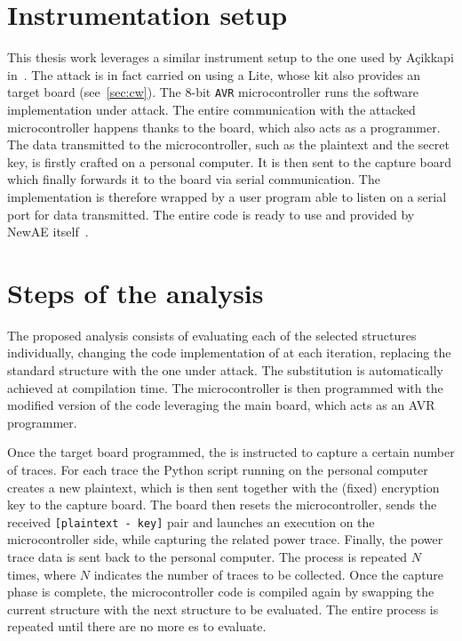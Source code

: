     \section{Instrumentation setup}

        This thesis work leverages a similar instrument setup to the one used by Açikkapi in~\cite{accikkapi2019side}. The attack is in fact carried on using a \cw{} Lite, whose kit also provides an \xmega{} target board (see~\ref{sec:cw}). The \xmega{} 8-bit \texttt{AVR} microcontroller runs the \aess{} software implementation under attack. The entire communication with the attacked microcontroller happens thanks to the \cw{} board, which also acts as a programmer. The data transmitted to the microcontroller, such as the plaintext and the secret key, is firstly crafted on a personal computer. It is then sent to the \cw{} capture board which finally forwards it to the \xmega{} board via serial communication. The \aess{} implementation is therefore wrapped by a user program able to listen on a serial port for data transmitted. The entire \xmega{} code is ready to use and provided by NewAE itself~\cite{cwgithub}.

    \section{Steps of the analysis}

        The proposed analysis consists of evaluating each of the selected structures individually, changing the code implementation of \aess{} at each iteration, replacing the standard \sbocs{} structure with the one under attack. The substitution is automatically achieved at compilation time. The microcontroller is then programmed with the modified version of the code leveraging the main \cw{} board, which acts as an AVR programmer. 
        
        Once the target board programmed, the \cw{} is instructed to capture a certain number of traces. For each trace the Python script running on the personal computer creates a new plaintext, which is then sent together with the (fixed) encryption key to the capture board. The board then resets the microcontroller, sends the received \texttt{[plaintext - key]} pair and launches an \aess{} execution on the microcontroller side, while capturing the related power trace. Finally, the power trace data is sent back to the personal computer. The process is repeated $N$ times, where $N$ indicates the number of traces to be collected. Once the capture phase is complete, the microcontroller code is compiled again by swapping the current structure with the next structure to be evaluated. The entire process is repeated until there are no more \sbocs{}es to evaluate.

